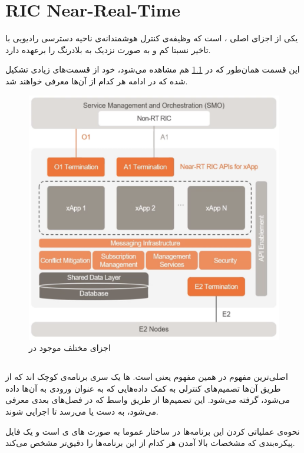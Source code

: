 \chapter{RIC Near-Real-Time}

یکی از اجزای اصلی
،
است که وظیفه‌ی کنترل هوشمندانه‌ی ناحیه دسترسی رادیویی با تاخیر نسبتا کم و به صورت نزدیک به بلادرنگ را برعهده دارد.

این قسمت همان‌طور که در 
\ref{fig:nrt-ric0}
هم مشاهده می‌شود، خود از قسمت‌های زیادی تشکیل شده که در ادامه هر کدام از آن‌ها معرفی خواهند شد.

\begin{figure}[H]
	\includegraphics[width=0.85\columnwidth]{Picture/nrt-ric0.png}
	\centering
	\caption{اجزای مختلف موجود در
	}
	\label{fig:nrt-ric0}
\end{figure}

\section{}
اصلی‌ترین مفهوم در 
همین مفهوم یعنی 
است. 
ها
یک سری برنامه‌ی کوچک اند که از طریق آن‌ها تصمیم‌های کنترلی به کمک داده‌هایی که به عنوان ورودی به آن‌ها داده می‌شود، گرفته می‌شود. این تصمیم‌ها از طریق واسط
که در فصل‌های بعدی معرفی می‌شود، به دست 
 یا
می‌رسد تا اجرایی شوند.

\begin{note}
نحوه‌ی عملیاتی کردن این برنامه‌ها در ساختار
عموما به صورت 
های
ی
است و یک فایل پیکره‌بندی که مشخصات بالا آمدن هر کدام از این برنامه‌ها را دقیق‌تر مشخص می‌کند.
\end{note}


